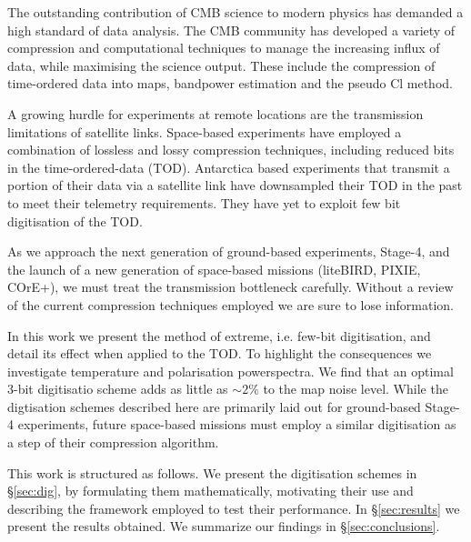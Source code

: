 \documentclass[apj]{emulateapj}
\begin{document}
The outstanding contribution of CMB science to modern physics has demanded a high standard of data analysis. The CMB community has developed a variety of compression and computational techniques to manage the increasing influx of data, while maximising the science output. These include the compression of time-ordered data into maps, bandpower estimation and the pseudo Cl method.

A growing hurdle for experiments at remote locations are the transmission limitations of satellite links. Space-based experiments have employed a combination of lossless and lossy compression techniques, including reduced bits in the time-ordered-data (TOD). Antarctica based experiments that transmit a portion of their data via a satellite link have downsampled their TOD in the past to meet their telemetry requirements. They have yet to exploit few bit digitisation of the TOD.

As we approach the next generation of ground-based experiments, Stage-4, and the launch of a new generation of space-based missions (liteBIRD, PIXIE, COrE+), we must treat the transmission bottleneck carefully. Without a review of the current compression techniques employed we are sure to lose information.

In this work we present the method of extreme, i.e. few-bit digitisation, and detail its effect when applied to the TOD. To highlight the consequences we investigate temperature and polarisation powerspectra. We find that an optimal 3-bit digitisatio scheme adds as little as $\sim 2\%$ to the map noise level. While the digtisation schemes described here are primarily laid out for ground-based Stage-4 experiments, future space-based missions must employ a similar digitisation as a step of their compression algorithm.

This work is structured as follows. We present the digitisation schemes in \S\ref{sec:dig}, by formulating them mathematically, motivating their use and describing the framework employed to test their performance. In \S\ref{sec:results} we present the results obtained. We summarize our findings in \S\ref{sec:conclusions}. 





\end{document}
